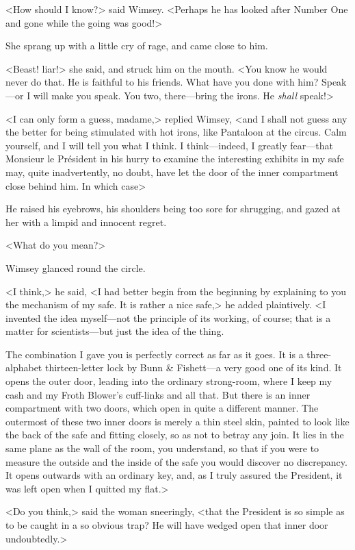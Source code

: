<How should I know?> said Wimsey. <Perhaps he has looked after Number One and gone while the going was good!>

She sprang up with a little cry of rage, and came close to him.

<Beast! liar!> she said, and struck him on the mouth. <You know he would never do that. He is faithful to his friends. What have you done with him? Speak—or I will make you speak. You two, there—bring the irons. He \emph{shall} speak!>

<I can only form a guess, madame,> replied Wimsey, <and I shall not guess any the better for being stimulated with hot irons, like Pantaloon at the circus. Calm yourself, and I will tell you what I think. I think—indeed, I greatly fear—that Monsieur le Président in his hurry to examine the interesting exhibits in my safe may, quite inadvertently, no doubt, have let the door of the inner compartment close behind him. In which case\longdash>

He raised his eyebrows, his shoulders being too sore for shrugging, and gazed at her with a limpid and innocent regret.

<What do you mean?>

Wimsey glanced round the circle.

<I think,> he said, <I had better begin from the beginning by explaining to you the mechanism of my safe. It is rather a nice safe,> he added plaintively. <I invented the idea myself—not the principle of its working, of course; that is a matter for scientists—but just the idea of the thing.

The combination I gave you is perfectly correct as far as it goes. It is a three-alphabet thirteen-letter lock by Bunn \& Fishett—a very good one of its kind. It opens the outer door, leading into the ordinary strong-room, where I keep my cash and my Froth Blower's cuff-links and all that. But there is an inner compartment with two doors, which open in quite a different manner. The outermost of these two inner doors is merely a thin steel skin, painted to look like the back of the safe and fitting closely, so as not to betray any join. It lies in the same plane as the wall of the room, you understand, so that if you were to measure the outside and the inside of the safe you would discover no discrepancy. It opens outwards with an ordinary key, and, as I truly assured the President, it was left open when I quitted my flat.>

<Do you think,> said the woman sneeringly, <that the President is so simple as to be caught in a so obvious trap? He will have wedged open that inner door undoubtedly.>

